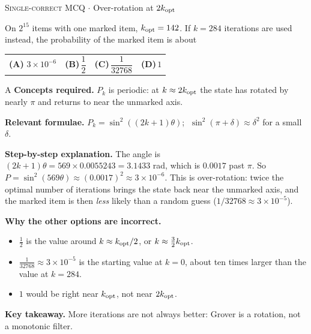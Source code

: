 \documentclass[11pt,a4paper]{article}
\newcommand{\optlabel}[1]{\textbf{(#1)}}
\newcommand{\correctlabel}[1]{\textcolor{okgreen}{\textbf{(#1)}\,\ding{51}}}
\newenvironment{qitem}[1]{\begin{list}{}{\setlength{\leftmargin}{3.3em}\setlength{\labelwidth}{3.1em}%
  \setlength{\labelsep}{0.2em}\setlength{\topsep}{3pt}\setlength{\parsep}{3pt}}\item[\textbf{Q.#1}\hfill]}{\end{list}}
\newcommand{\qsep}{\par\vspace{2pt}{\color{black!15}\hrule}\vspace{4pt}}
\newcommand{\qmeta}[2]{{\footnotesize\color{black!60}\textsc{#1} \;$\cdot$\; #2}\par}
\begin{document}
\begin{qitem}{52}
\qmeta{Single-correct MCQ}{Over-rotation at $2k_{\rm opt}$}
On $2^{15}$ items with one marked item, $k_{\rm opt} = 142$. If $k = 284$ iterations are used instead, the probability of the marked item is about
\par\smallskip\noindent\begin{tabularx}{\linewidth}{@{}*{4}{L}@{}}
\correctlabel{A}\,$3\times10^{-6}$ & \optlabel{B}\,$\dfrac12$ & \optlabel{C}\,$\dfrac{1}{32768}$ & \optlabel{D}\,$1$
\end{tabularx}
\end{qitem}
\begin{solbox}{A}
\textbf{\color{brand}Concepts required.} $P_k$ is periodic: at $k \approx 2k_{\rm opt}$ the state has rotated by nearly $\pi$ and returns to near the unmarked axis.

\textbf{\color{brand}Relevant formulae.} $P_k = \sin^2((2k+1)\theta)$; $\;\sin^2(\pi + \delta) \approx \delta^2$ for a small $\delta$.

\textbf{\color{brand}Step-by-step explanation.} The angle is $(2k+1)\theta = 569\times0.0055243 = 3.1433$ rad, which is $0.0017$ past $\pi$. So $P = \sin^2(569\theta) \approx (0.0017)^2 \approx 3\times10^{-6}$.
This is over-rotation: twice the optimal number of iterations brings the state back near the unmarked axis, and the marked item is then \emph{less} likely than a random guess ($1/32768 \approx 3\times10^{-5}$).

\textbf{\color{brand}Why the other options are incorrect.}
\begin{itemize}[leftmargin=2.4em, itemsep=1pt, topsep=2pt]
\item[\textbf{(B)}] $\frac12$ is the value around $k \approx k_{\rm opt}/2$, or $k \approx \frac32 k_{\rm opt}$.
\item[\textbf{(C)}] $\frac{1}{32768} \approx 3\times10^{-5}$ is the starting value at $k = 0$, about ten times larger than the value at $k = 284$.
\item[\textbf{(D)}] $1$ would be right near $k_{\rm opt}$, not near $2k_{\rm opt}$.
\end{itemize}
\textbf{\color{brand}Key takeaway.} More iterations are not always better: Grover is a rotation, not a monotonic filter.
\end{solbox}
\qsep
\end{document}
